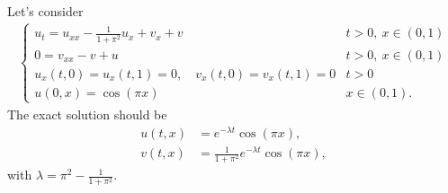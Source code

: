 \documentclass[12pt]{article} %
\begin{document}


Let's consider
\begin{align*}
  \begin{cases}
    u_t = u_{xx} - \frac{1}{1+\pi^2} u_x + v_x + v         & t>0,\: x\in (0,1) \\
    0 = v_{xx} - v + u                                     & t>0,\: x\in (0,1) \\
    u_x(t,0) = u_x(t,1) = 0, \quad v_x(t,0) = v_x(t,1) = 0 & t>0               \\
    u(0,x) = \cos(\pi x)                                   & x \in (0,1).
  \end{cases}
\end{align*}
The exact solution should be
\begin{align*}
  u(t,x) & = e^{-\lambda t} \cos(\pi x),                  \\
  v(t,x) & = \frac{1}{1+\pi^2} e^{-\lambda t} \cos(\pi x),
\end{align*}
with $\lambda = \pi^2 - \frac{1}{1+\pi^2}$.



\end{document}
